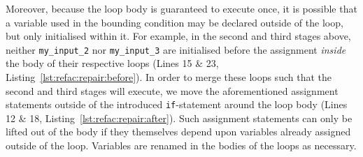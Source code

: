 %
%
Moreover, because the loop body is guaranteed to execute once, it is possible that a variable used in the bounding condition may be declared outside of the loop, but only initialised within it. For example, in the second and third stages above, neither \lstinline|my_input_2| nor \lstinline|my_input_3| are initialised before the assignment \emph{inside} the body of their respective loops (Lines 15 \& 23, Listing~\ref{lst:refac:repair:before}). In order to merge these loops such that the second and third stages will execute, we move the aforementioned assignment statements outside of the introduced \lstinline{if}-statement around the loop body (Lines 12 \& 18, Listing~\ref{lst:refac:repair:after}). Such assignment statements can only be lifted out of the body if they themselves depend upon variables already assigned outside of the loop.
%
%
%
%
Variables are renamed in the bodies of the loops as necessary.
%




